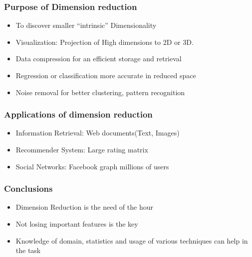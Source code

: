 \begin{frame}[fragile]\frametitle{Purpose of Dimension reduction}
	\begin{itemize}
	\item To discover smaller ``intrinsic'' Dimensionality
	\item Visualization: Projection of High dimensions to 2D or 3D. 
	\item Data compression for an efficient storage and retrieval
	\item Regression or classification more accurate in reduced space
	\item Noise removal for better clustering, pattern recognition
	\end{itemize}
\end{frame}



\begin{frame}[fragile]\frametitle{Applications of dimension reduction}
	\begin{itemize}
	\item Information Retrieval: Web documents(Text,  Images) 
	\item Recommender System: Large rating matrix 
	\item Social Networks: Facebook graph millions of users 
	\end{itemize}
\end{frame}




\begin{frame}[fragile]\frametitle{Conclusions}
	\begin{itemize}
	\item Dimension Reduction is the need of the hour
	\item Not losing important features is the key
	\item Knowledge of domain, statistics and usage of various techniques can help in the task
	\end{itemize}
\end{frame}

